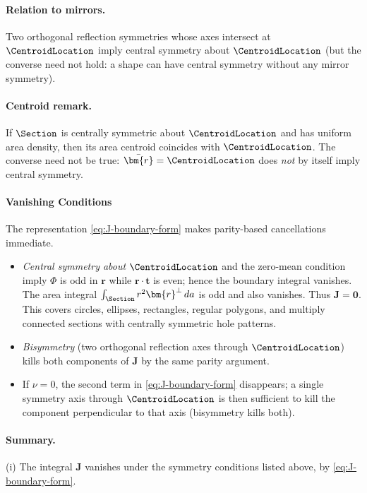 \begin{Quote}
\paragraph{Relation to mirrors.}
Two orthogonal reflection symmetries whose axes intersect at \(\CentroidLocation\) imply central symmetry about \(\CentroidLocation\) (but the converse need not hold: a shape can have central symmetry without any mirror symmetry).

\paragraph{Centroid remark.}
If \(\Section\) is centrally symmetric about \(\CentroidLocation\) and has uniform area density, then its area centroid coincides with \(\CentroidLocation\). 
The converse need not be true: \(\bar{\bm{r}}=\CentroidLocation\) does \emph{not} by itself imply central symmetry.

\paragraph{Vanishing Conditions}
The representation \eqref{eq:J-boundary-form} makes parity-based
cancellations immediate.
\begin{itemize}
\item \emph{Central symmetry about \(\CentroidLocation\)} and the zero-mean condition imply
\(\Phi\) is odd in \(\bm{r}\) while \(\bm{r}\cdot\bm{t}\) is even;
hence the boundary integral vanishes. The area integral
\(\int_{\Section} r^2\bm{r}^\perp\,da\) is odd and also vanishes.
Thus \(\bm{J}=\mathbf{0}\). This covers circles, ellipses, rectangles, regular
polygons, and multiply connected sections with centrally symmetric hole patterns.
\item \emph{Bisymmetry} (two orthogonal reflection axes through \(\CentroidLocation\))
kills both components of \(\bm{J}\) by the same parity argument.
\item If \(\nu=0\), the second term in \eqref{eq:J-boundary-form} disappears; a
single symmetry axis through \(\CentroidLocation\) is then sufficient to kill the
component perpendicular to that axis (bisymmetry kills both).
\end{itemize}


\paragraph{Summary.}
(i) The integral \(\bm{J}\) vanishes under the symmetry conditions listed above,
by \eqref{eq:J-boundary-form}. 
\end{Quote}


